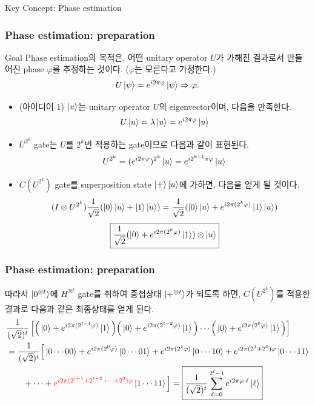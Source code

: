 \documentclass[9pt]{beamer}
\begin{document}
    \begin{section}{Key Concept: Phase estimation}
        \begin{frame}
            \frametitle{Phase estimation: preparation}
            \begin{block}{Goal}
                Phase estimation의 목적은, 어떤 unitary operator $U$가 가해진 결과로서 만들어진 phase $\varphi$를 추정하는 것이다. ($\varphi$는 모른다고 가정한다.)
                $$ U \ket{\psi} = e^{i2\pi \varphi} \ket \psi \Rightarrow \varphi.$$
            \end{block}
            \begin{itemize}
                \item (아이디어 1) $\ket u$는 unitary operator $U$의 eigenvector이며, 다음을 만족한다.
                $$U\ket{u} = \lambda \ket{u} = e^{i 2\pi \varphi} \ket{u}$$
                \item $U^{2^k}$ gate는 $U$를 $2^k$번 적용하는 gate이므로 다음과 같이 표현된다.
                $$ U^{2^k} = (e^{i 2\pi \varphi})^{2^k} \ket u = e^{i 2^{k+1}\pi \varphi}\ket u$$
                \item $C(U^{2^k})$ gate를 superposition state $\ket +\ket{u}$에 가하면, 다음을 얻게 될 것이다.
                $$(I \otimes U^{2^k}) \frac{1}{\sqrt 2}(\ket 0 \ket u+ \ket 1 \ket u)  = \frac{1}{\sqrt 2}(\ket 0 \ket u + e^{i2\pi (2^{k}\varphi)}\ket 1 \ket u)$$
                $$\boxed{\frac{1}{\sqrt 2}( \ket 0 + e^{i2\pi (2^{k}\varphi)}\ket 1 )\otimes \ket u}$$
            \end{itemize}

        \end{frame}

        \begin{frame}
            \frametitle{Phase estimation: preparation}
            
            따라서 $\ket{0^{\otimes t}}$에 $H^{\otimes t}$ gate를 취하여 중첩상태 $\ket{+^{\otimes t}}$가 되도록 하면, $C(U^{2^k})$를 적용한 결과로 다음과 같은 최종상태를 얻게 된다.
            \small \[ \begin{aligned} &\frac{1}{(\sqrt 2)^t}\left[ \Big(\ket 0 + e^{i 2\pi (2^{t-1}\varphi)}\ket 1\Big) \Big(\ket 0 + e^{i 2 \pi  ({2^{t-2}\varphi})}\ket 1\Big) \cdots \Big(\ket 0 + e^{i 2\pi ({2^{0}\varphi})}\ket 1 \Big)\right] 
                \\ &= \frac{1}{(\sqrt 2)^t}\Big[ \ket{0 \cdots 00} +e^{i2\pi(2^0\varphi)}\ket{0\cdots 01} + e^{i2\pi(2^1\varphi)}\ket{0\cdots 10} + e^{i2\pi(2^1+2^{0})\varphi}\ket{0\cdots 11}
                \\ &\qquad + \cdots + {\color{red}e^{i2\pi (2^{t-1}+2^{t-2}+\cdots +2^0)\varphi} }\ket{1 \cdots 11}\Big] = \boxed{\frac{1}{(\sqrt {2})^t} \sum^{2^t-1}_{\ell=0} e^{i2\pi \varphi \cdot \ell} \ket{\ell}} \end{aligned} 
            \]
            \vspace{-0.2cm}


\end{frame}
\end{section}
\end{document}
